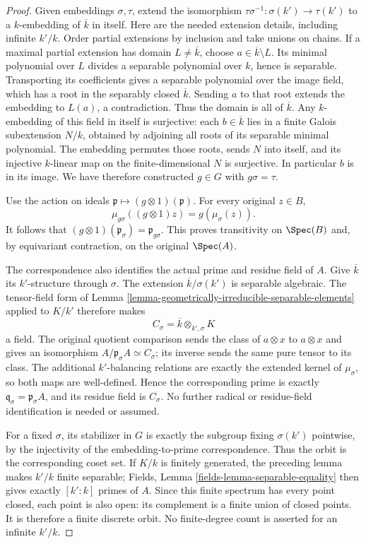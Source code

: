 \begin{proof}
Given embeddings $\sigma,\tau$,
extend the isomorphism
$\tau\sigma^{-1}:\sigma(k')\to\tau(k')$
to a $k$-embedding of $\overline k$
in itself. Here are the needed
extension details, including
infinite $k'/k$. Order partial
extensions by inclusion and
take unions on chains. If a
maximal partial extension has
domain $L\neq\overline k$, choose
$a\in\overline k\setminus L$.
Its minimal polynomial over
$L$ divides a separable
polynomial over $k$, hence is
separable. Transporting its
coefficients gives a separable
polynomial over the image field,
which has a root in the
separably closed $\overline k$.
Sending $a$ to that root extends
the embedding to $L(a)$, a
contradiction. Thus the domain
is all of $\overline k$.
Any $k$-embedding of this field
in itself is surjective: each
$b\in\overline k$ lies in a
finite Galois subextension $N/k$,
obtained by adjoining all roots
of its separable minimal polynomial.
The embedding permutes those
roots, sends $N$ into itself,
and its injective $k$-linear
map on the finite-dimensional
$N$ is surjective. In particular
$b$ is in its image. We have
therefore constructed $g\in G$
with $g\sigma=\tau$.

Use the action on ideals
$\mathfrak p\mapsto(g\otimes1)(\mathfrak p)$.
For every original $z\in B$,
$$
\mu_{g\sigma}((g\otimes1)z)=g(\mu_\sigma(z)).
$$
It follows that
$(g\otimes1)(\mathfrak p_\sigma)=\mathfrak p_{g\sigma}$.
This proves transitivity on
$\Spec(B)$ and, by equivariant
contraction, on the original
$\Spec(A)$.

The correspondence also identifies
the actual prime and residue
field of $A$. Give $\overline k$
its $k'$-structure through
$\sigma$. The extension
$\overline k/\sigma(k')$ is
separable algebraic. The tensor-field
form of Lemma
\ref{lemma-geometrically-irreducible-separable-elements}
applied to $K/k'$ therefore makes
$$
C_\sigma=\overline k\otimes_{k',\sigma}K
$$
a field. The original quotient
comparison sends the class of
$a\otimes x$ to $a\otimes x$
and gives an isomorphism
$A/\mathfrak p_\sigma A\simeq C_\sigma$;
its inverse sends the same pure
tensor to its class. The additional
$k'$-balancing relations are
exactly the extended kernel
of $\mu_\sigma$, so both maps
are well-defined. Hence the
corresponding prime is exactly
$\mathfrak q_\sigma=\mathfrak p_\sigma A$,
and its residue field is
$C_\sigma$. No further radical
or residue-field identification
is needed or assumed.

For a fixed $\sigma$, its
stabilizer in $G$ is exactly
the subgroup fixing $\sigma(k')$
pointwise, by the injectivity
of the embedding-to-prime
correspondence. Thus the orbit
is the corresponding coset
set. If $K/k$ is finitely
generated, the preceding lemma
makes $k'/k$ finite separable;
Fields, Lemma
\ref{fields-lemma-separable-equality}
then gives exactly $[k':k]$
primes of $A$. Since this
finite spectrum has every
point closed, each point is
also open: its complement is
a finite union of closed
points. It is therefore a
finite discrete orbit. No
finite-degree count is asserted
for an infinite $k'/k$.
\end{proof}